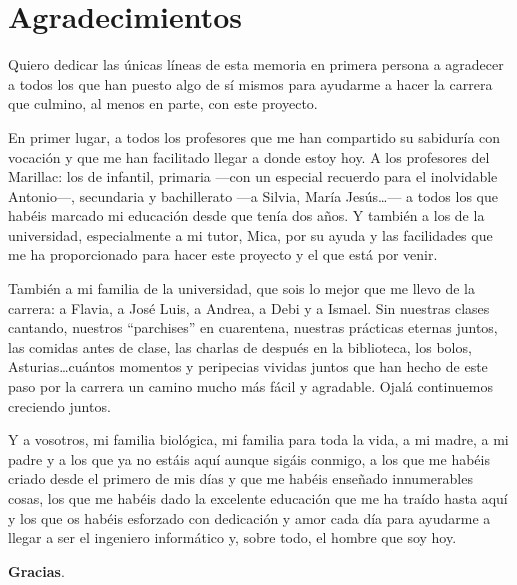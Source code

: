 \chapter*{Agradecimientos}

Quiero dedicar las únicas líneas de esta memoria en primera persona a agradecer a todos los que han puesto algo de sí mismos para ayudarme a hacer la carrera que culmino, al menos en parte, con este proyecto.

En primer lugar, a todos los profesores que me han compartido su sabiduría con vocación y que me han facilitado llegar a donde estoy hoy. A los profesores del Marillac: los de infantil, primaria ---con un especial recuerdo para el inolvidable Antonio---, secundaria y bachillerato ---a Silvia, María Jesús\dots--- a todos los que habéis marcado mi educación desde que tenía dos años. Y también a los de la universidad, especialmente a mi tutor, Mica, por su ayuda y las facilidades que me ha proporcionado para hacer este proyecto y el que está por venir.

También a mi familia de la universidad, que sois lo mejor que me llevo de la carrera: a Flavia, a José Luis, a Andrea, a Debi y a Ismael. Sin nuestras clases cantando, nuestros ``parchises'' en cuarentena, nuestras prácticas eternas juntos, las comidas antes de clase, las charlas de después en la biblioteca, los bolos, Asturias\dots cuántos momentos y peripecias vividas juntos que han hecho de este paso por la carrera un camino mucho más fácil y agradable. Ojalá continuemos creciendo juntos.

Y a vosotros, mi familia biológica, mi familia para toda la vida, a mi madre, a mi padre y a los que ya no estáis aquí aunque sigáis conmigo, a los que me habéis criado desde el primero de mis días y que me habéis enseñado innumerables cosas, los que me habéis dado la excelente educación que me ha traído hasta aquí y los que os habéis esforzado con dedicación y amor cada día para ayudarme a llegar a ser el ingeniero informático y, sobre todo, el hombre que soy hoy.

\begin{center}
    \textbf{Gracias}.
\end{center}